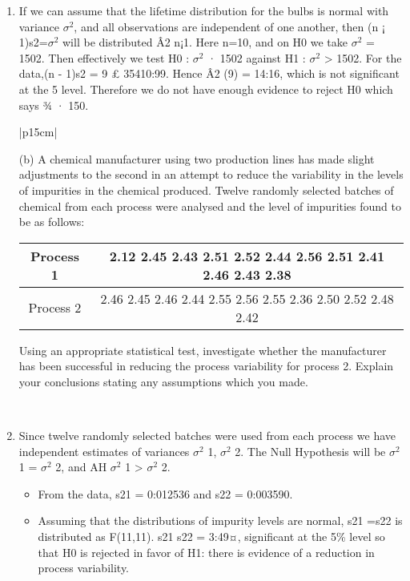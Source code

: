 \documentclass[a4paper,12pt]{article}
\begin{document}
\begin{enumerate}
\item If we can assume that the lifetime distribution for the bulbs is normal with variance $\sigma^2$,
and all observations are independent of one another, then (n ¡ 1)s2=$\sigma^2$ will be distributed Â2
n¡1.
Here n=10, and on H0 we take $\sigma^2$ = 1502. Then effectively we test H0 : $\sigma^2$ · 1502 against
H1 : $\sigma^2$ > 1502.
For the data,(n - 1)s2 = 9 £ 35410:99. Hence Â2
(9) = 14:16, which is not significant at the 5%
level. Therefore we do not have enough evidence to reject H0 which says ¾ · 150.
\begin{table}[ht!]
 
\centering
 
\begin{tabular}{|p{15cm}|}
 
\hline  

(b) A chemical manufacturer using two production lines has made slight adjustments to the second in an attempt to reduce the variability in the levels of impurities in the chemical produced.  Twelve randomly selected batches of chemical from each process were analysed and the level of impurities found to be as follows:

\begin{center}
\begin{tabular}{|c|c|} \hline
Process 1 & 2.12 2.45 2.43 2.51 2.52 2.44 2.56 2.51 2.41 2.46 2.43 2.38\\ \hline
Process 2 & 2.46 2.45 2.46 2.44 2.55 2.56 2.55 2.36 2.50 2.52 2.48 2.42 \\ \hline
\end{tabular}
\end{center}
Using an appropriate statistical test, investigate whether the manufacturer has been successful in reducing the process variability for process 2.  
Explain your conclusions  stating any assumptions which you made.

\\ \hline
  
\end{tabular}

\end{table}

\item Since twelve randomly selected batches were used from each process we have independent estimates
of variances $\sigma^2$
1, $\sigma^2$
2. The Null Hypothesis will be $\sigma^2$
1 = $\sigma^2$
2, and AH $\sigma^2$
1 > $\sigma^2$
2.
\begin{itemize}
\item From the data, s21
= 0:012536 and s22
= 0:003590.
\item Assuming that the distributions of impurity levels are normal, s21
=s22
is distributed as F(11,11).
s21
s22
= 3:49¤, significant at the 5\% level so that H0 is rejected in favor of H1: there is evidence of a
reduction in process variability.
\end{itemize}
\end{enumerate}
\end{document}
